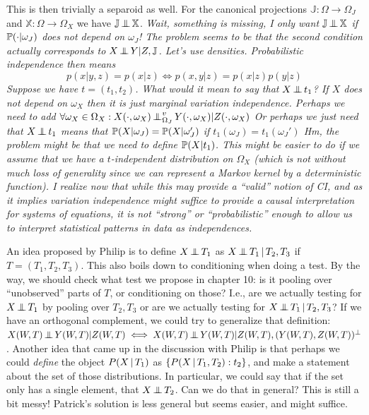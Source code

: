 This is then trivially a separoid as well. For the canonical projections $\mathbb{J} : \Omega \to \Omega_J$ and $\mathbb{X} : \Omega \to \Omega_X$ we have $\mathbb{J} \operatorname*{\perp\mkern-11mu\perp} \mathbb{X}$.
\emph{Wait, something is missing, I only want $\mathbb{J} \operatorname*{\perp\mkern-11mu\perp} \mathbb{X}$ if $\mathbb{P}(\cdot|\omega_J)$ does not depend on $\omega_J$! The problem seems to be that the second condition actually corresponds to $X \operatorname*{\perp\mkern-11mu\perp} Y | Z,\mathbb{J}$.
Let's use densities. Probabilistic independence then means
$$p(x|y,z) = p(x|z) \iff p(x,y|z) = p(x|z) p(y|z)$$
Suppose we have $t=(t_1,t_2)$. What would it mean to say that $X \operatorname*{\perp\mkern-11mu\perp} t_1$? If $X$ does not depend on $\omega_X$ then it is just marginal variation independence. Perhaps we need to add 
  $\forall \omega_X \in \Omega_X: X(\cdot,\omega_X) \operatorname*{\perp\mkern-11mu\perp}^v_{\Omega_J} Y(\cdot,\omega_X) | Z(\cdot,\omega_X)$
Or perhaps we just need that $X \operatorname*{\perp\mkern-11mu\perp} t_1$ means that $\mathbb{P}(X | \omega_J) = \mathbb{P}(X | \omega_J')$ if $t_1(\omega_J) = t_1(\omega_J')$
Hm, the problem might be that we need to define $\mathbb{P}(X | t_1)$.
This might be easier to do if we assume that we have a $t$-independent distribution on $\Omega_X$ (which is not without much loss of generality since we can represent a Markov kernel by a deterministic function).
I realize now that while this may provide a ``valid'' notion of CI, and as it implies variation independence might suffice to provide a causal interpretation for systems of equations, it is not ``strong'' or ``probabilistic'' enough to allow us to interpret statistical patterns in data as independences.
}

An idea proposed by Philip is to define $X \operatorname*{\perp\mkern-11mu\perp} T_1$ as $X \operatorname*{\perp\mkern-11mu\perp} T_1 \operatorname*{|} T_2,T_3$ if $T = (T_1,T_2,T_3)$.
This also boils down to conditioning when doing a test. By the way, we should check what test we propose in chapter 10: is it pooling over ``unobserved'' parts of $T$, or conditioning on those? I.e., are we actually testing for $X \operatorname*{\perp\mkern-11mu\perp} T_1$ by pooling over $T_2,T_3$ or are we actually testing for $X \operatorname*{\perp\mkern-11mu\perp} T_1 \operatorname*{|} T_2,T_3$? If we have an orthogonal complement, we could try to generalize that definition: $X(W,T) \operatorname*{\perp\mkern-11mu\perp} Y(W,T) | Z(W,T) \iff X(W,T) \operatorname*{\perp\mkern-11mu\perp} Y(W,T) | Z(W,T), (Y(W,T),Z(W,T))^\perp$. Another idea that came up in the discussion with Philip is that perhaps we could \emph{define} the object $P(X\operatorname*{|} T_1)$ as $\{P(X\operatorname*{|} T_1,T_2) : t_2\}$, and make a statement about the set of those distributions. In particular, we could say that if the set only has a single element, that $X \operatorname*{\perp\mkern-11mu\perp} T_2$. Can we do that in general? This is still a bit messy! Patrick's solution is less general but seems easier, and might suffice.

